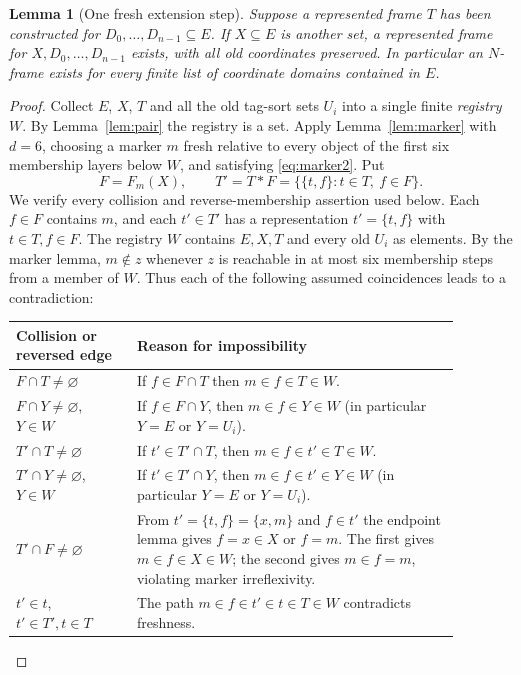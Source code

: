 \documentclass[11pt,a4paper]{article}
\numberwithin{equation}{section}
\newtheorem{lemma}[theorem]{Lemma}
\newcommand{\up}[2]{\{#1,#2\}}
\newcommand{\UnProd}{\mathbin{\ast}}
\begin{document}
\begin{lemma}[One fresh extension step]\label{lem:extension}
Suppose a represented frame $T$ has been constructed for $D_0,\ldots,D_{n-1}\subseteq E$.  If $X\subseteq E$ is another set, a represented frame for $X,D_0,\ldots,D_{n-1}$ exists, with all old coordinates preserved.  In particular an $N$-frame exists for every finite list of coordinate domains contained in $E$.
\end{lemma}
\begin{proof}
Collect $E$, $X$, $T$ and all the old tag-sort sets $U_i$ into a single finite \emph{registry} $W$.  By Lemma~\ref{lem:pair} the registry is a set.  Apply Lemma~\ref{lem:marker} with $d=6$, choosing a marker $m$ fresh relative to every object of the first six membership layers below $W$, and satisfying \eqref{eq:marker2}.  Put
\begin{equation}\label{eq:tuple-extension}
F=F_m(X),\qquad T'=T\UnProd F
 =\{\up tf:t\in T,\ f\in F\}.
\end{equation}
We verify every collision and reverse-membership assertion used below.  Each $f\in F$ contains $m$, and each $t'\in T'$ has a representation $t'=\up tf$ with $t\in T,f\in F$.  The registry $W$ contains $E,X,T$ and every old $U_i$ as elements.  By the marker lemma, $m\notin z$ whenever $z$ is reachable in at most six membership steps from a member of $W$.  Thus each of the following assumed coincidences leads to a contradiction:
\begin{center}
\renewcommand{\arraystretch}{1.22}
\begin{tabular}{@{}p{0.24\linewidth}p{0.64\linewidth}@{}}
\toprule
Collision or reversed edge & Reason for impossibility \\
\midrule
$F\cap T\ne\varnothing$ & If $f\in F\cap T$ then $m\in f\in T\in W$. \\
$F\cap Y\ne\varnothing$, $Y\in W$ & If $f\in F\cap Y$, then $m\in f\in Y\in W$ (in particular $Y=E$ or $Y=U_i$). \\
$T'\cap T\ne\varnothing$ & If $t'\in T'\cap T$, then $m\in f\in t'\in T\in W$. \\
$T'\cap Y\ne\varnothing$, $Y\in W$ & If $t'\in T'\cap Y$, then $m\in f\in t'\in Y\in W$ (in particular $Y=E$ or $Y=U_i$). \\
$T'\cap F\ne\varnothing$ & From $t'=\up tf=\up xm$ and $f\in t'$ the endpoint lemma gives $f=x\in X$ or $f=m$.  The first gives $m\in f\in X\in W$; the second gives $m\in f=m$, violating marker irreflexivity. \\
$t'\in t$, $t'\in T',t\in T$ & The path $m\in f\in t'\in t\in T\in W$ contradicts freshness. \\

\end{tabular}
\end{center}
\end{proof}
\end{document}
